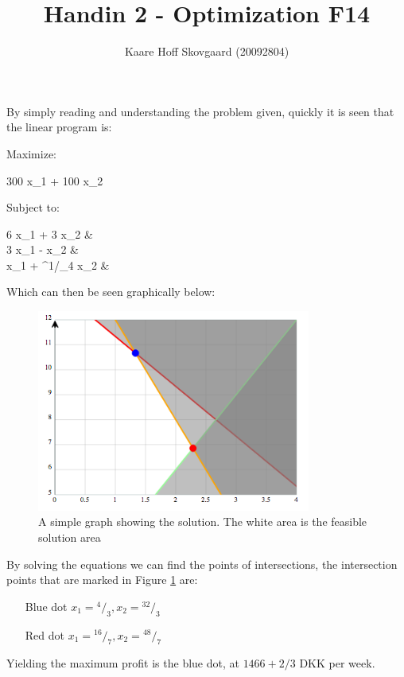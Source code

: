 \documentclass{report}
\author{Kaare Hoff Skovgaard (20092804)}
\title{Handin 2 - Optimization F14}
\newenvironment{eq*}[0]{
	\begin{equation*}
	\begin{aligned}
}{
	\end{aligned}
	\end{equation*}
}
\newcommand*\rfrac[2]{{}^{#1}\!/_{#2}}
\begin{document}
	\maketitle

	By simply reading and understanding the problem given, quickly it is seen that the linear program is:

	Maximize:
	\begin{eq*}
		300 x_1 + 100 x_2
	\end{eq*}
	Subject to:
	\begin{eq*}
		6 x_1 + 3 x_2 & \\
		3 x_1 - x_2 & \\
		x_1 + \rfrac{1}{4} x_2 &
	\end{eq*}

	Which can then be seen graphically below:

	\begin{figure}[ht!]
		\centering
		\includegraphics[width=90mm]{afl2_graph.png}
		\caption{A simple graph showing the solution. The white area is the feasible solution area}
		\label{fig:graph}
	\end{figure}

	By solving the equations we can find the points of intersections, the intersection points that are marked in Figure \ref{fig:graph} are:

	\begin{enumerate}
		\item[Blue dot] $x_1 = \rfrac{4}{3}, x_2 = \rfrac{32}{3}$
		\item[Red dot] $x_1 = \rfrac{16}{7}, x_2 = \rfrac{48}{7}$
	\end{enumerate}

	Yielding the maximum profit is the blue dot, at $1466 + 2/3$ DKK per week.
\end{document}
